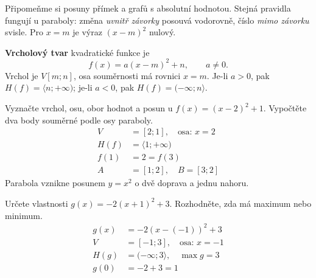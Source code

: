 \documentclass[11pt,a4paper]{article}
\begin{document}
Připomeňme si posuny přímek a grafů s absolutní hodnotou. Stejná pravidla fungují u paraboly: změna \emph{uvnitř závorky} posouvá vodorovně, číslo \emph{mimo závorku} svisle. Pro $x=m$ je výraz $(x-m)^2$ nulový.
\begin{definiceBox}[title={Definice - Vrcholový tvar kvadratické funkce}]
\textbf{Vrcholový tvar} kvadratické funkce je
\[ f(x)=a(x-m)^2+n,\qquad a\ne0.\]
Vrchol je $V[m;n]$, osa souměrnosti má rovnici $x=m$.
Je-li $a>0$, pak $H(f)=\langle n;+\infty)$; je-li $a<0$, pak $H(f)=(-\infty;n\rangle$.
\end{definiceBox}
\begin{center}
\end{center}

\begin{prikladReseniBox}[title={Příklad 1}]
Vyznačte vrchol, osu, obor hodnot a posun u $f(x)=(x-2)^2+1$. Vypočtěte dva body souměrné podle osy paraboly.
\tcblower
\[
\begin{aligned}
V&=[2;1],\quad\text{osa: }x=2 \\
H(f)&=\langle1;+\infty) \\
f(1)&=2=f(3) \\
A&=[1;2],\quad B=[3;2]
\end{aligned}
\]
Parabola vznikne posunem $y=x^2$ o dvě doprava a jednu nahoru.
\end{prikladReseniBox}
\begin{prikladReseniBox}[title={Příklad 2}]
Určete vlastnosti $g(x)=-2(x+1)^2+3$. Rozhodněte, zda má maximum nebo minimum.
\tcblower
\[
\begin{aligned}
g(x)&=-2(x-(-1))^2+3 \\
V&=[-1;3],\quad \text{osa: }x=-1 \\
H(g)&=(-\infty;3\rangle,\quad \max g=3 \\
g(0)&=-2+3=1
\end{aligned}
\]

\end{prikladReseniBox}
\end{document}
